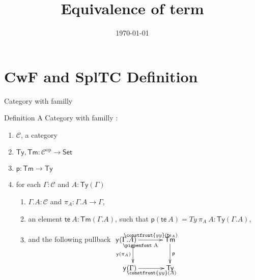 \documentclass[
  ignorenonframetext,
  aspectratio=169,
  usenames,
  dvipsnames
]{beamer}
\title{Equivalence of term}
\date{\today} %
\makeatletter
\newcommand{\pb}{\ar@{}[dr]|<<{\text{\pigpenfont A}}}
\newcommand{\constfont}[1]{\ensuremath{\mathsf{#1}}}
\newcommand{\CC}{{\mathcal{C}}}
\newcommand{\Ty}{\constfont{Ty}}
\newcommand{\Tm}{\constfont{Tm}}
\newcommand{\op}{^{\mathrm{op}}}
\newcommand{\set}{\ensuremath{\constfont{Set}}\xspace}
\newcommand{\p}{\constfont{p}}
\newcommand{\compext}[2]{\ensuremath{{#1}.{#2}}}
\newcommand{\deppr}[1]{\constfont{\pi}_{#1}}
\newcommand{\te}{\ensuremath{\constfont{te}}}
\newcommand{\yofunctor}[1][]{\constfont{y}_{#1}}
\newcommand{\yotranspose}[1]{\constfront{yy}({#1})}
\makeatother
\begin{document}
\begin{frame}[fragile]
\titlepage %
\end{frame}

\section{CwF and SplTC Definition}
\begin{frame}{Category with familly}
    \begin{block}{Definition}
        A Category with familly : \begin{enumerate}
          \item  $\CC$, a category
          \item $\Ty, \Tm : \CC\op \to \set$
          \item $\p : \Tm \to \Ty$
          \item for each $\Gamma : \CC$ and $A : \Ty(\Gamma)$
            \begin{enumerate}
            \item $\Gamma.A : \CC$ and $\pi_A : \Gamma.A \to \Gamma$,
            \item an element $\te\ A : \Tm(\Gamma.A)$, such that $\p (\te\ A) = Ty\ \pi_A\ A : \Ty(\Gamma.A)$,
            \item and the following pullback
              $
                \begin{xy}
                  \xymatrix{
                    **[l]\yofunctor(\compext{\Gamma}{A})  \ar[r]^-{\yotranspose{\te_A}} \ar[d]_{\yofunctor(\deppr{A})}  \pb & \Tm \ar[d]^{\p}\\
                    **[l]\yofunctor(\Gamma) \ar[r]_{\yotranspose{A}}& \Ty
                  }
                \end{xy}
              $
          \end{enumerate}
      \end{enumerate}
    \end{block}
\end{frame}
\end{document}
